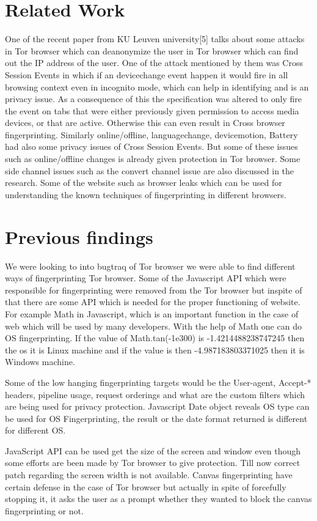 \documentclass[conference]{IEEEtran}
\begin{document}
\section*{Related Work}
One of the recent paper from KU Leuven university[5] talks about some attacks in Tor browser which can deanonymize the user in Tor browser which can find out the IP address of the user. One of the attack mentioned by them was Cross Session Events in which if an devicechange event happen it would fire in all browsing context even in incognito mode, which can help in identifying and is an privacy issue. As a consequence of this the specification was altered to only fire the event on tabs that were either previously given permission to access media devices, or that are active. Otherwise this can even result in Cross browser fingerprinting. Similarly online/offline, languagechange, devicemotion, Battery had also some privacy issues of Cross Session Events. But some of these issues such as online/offline changes is already given protection in Tor browser. Some side channel issues such as the convert channel issue are also discussed in the research. Some of the website such as browser leaks which can be used for understanding the known techniques of fingerprinting in different browsers.

\section*{Previous findings}
We were looking to into bugtraq of Tor browser we were able to find different ways of fingerprinting Tor browser. Some of the Javascript API which were responsible for fingerprinting were removed from the Tor browser but inspite of that there are some API which is needed for the proper functioning of website. For example Math in Javascript, which is an important function in the case of web which will be used by many developers. With the help of Math one can do OS fingerprinting. If the value of Math.tan(-1e300) is -1.4214488238747245 then the os it is Linux machine and if the value is then -4.987183803371025 then it is Windows machine.

Some of the low hanging fingerprinting targets would be the User-agent, Accept-* headers, pipeline usage, request orderings and what are the custom filters which are being used for privacy protection. Javascript Date object reveals OS type can be used for OS Fingerprinting, the result or the date format returned is different for different OS. 

JavaScript API can be used get the size of the screen and window even though some efforts are been made by Tor browser to give protection. Till now correct patch regarding the screen width is not available. Canvas fingerprinting have certain defense in the case of Tor browser but actually in spite of forcefully stopping it, it asks the user as a prompt whether they wanted to block the canvas fingerprinting or not. 
\end{document}
